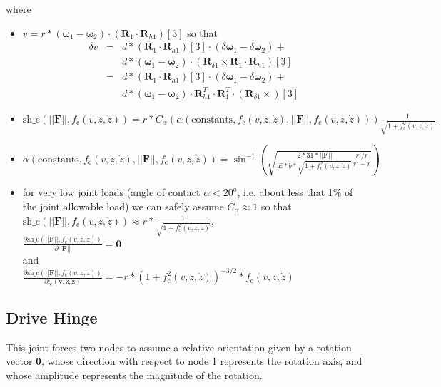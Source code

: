 \documentclass[10pt,dvips,fleqn]{report}
\newcommand{\T}[1]{\boldsymbol{#1}}
\begin{document}
where
\begin{itemize}
\item
$v=r * (\T \omega_{1}-\T \omega_{2})\cdot(\T R_1\cdot \T R_{h1})[3]$
so that
\begin{eqnarray*}
\delta v &=& d * (\T R_1\cdot \T R_{h1})[3] \cdot (\delta \T \omega_{1}- \delta \T \omega_{2}) +\\
	&& d * (\T \omega_{1}-\T \omega_{2})\cdot (\T R_{\delta 1} \times \T R_1 \cdot \T R_{h1})[3]\\
	&=& d * (\T R_1\cdot \T R_{h1})[3] \cdot (\delta \T \omega_{1}- \delta \T \omega_{2}) +\\
	&& d * (\T \omega_{1}-\T \omega_{2})\cdot \T R_{h1}^T \cdot \T R_1^T \cdot (\T R_{\delta 1} \times )[3]
\end{eqnarray*}
\item
$
\mathrm{sh\_c}(||\T F||, f_{\mathrm{c}}(v,z,\dot{z}))=
r * 
C_\alpha(
	\alpha(\mathrm{constants},
		f_{\mathrm{c}}(v,z,\dot{z}),
		||\T F||,
		f_{\mathrm{c}}(v,z,\dot{z})
	)
) 
\frac{\displaystyle 1}{\displaystyle \sqrt{1+f_{\mathrm{c}}^2(v,z,\dot{z})}}
$
\item
$
\alpha(\mathrm{constants},
	f_{\mathrm{c}}(v,z,\dot{z}),
	||\T F||,
	f_{\mathrm{c}}(v,z,\dot{z})
) =
\sin^{-1}\left(
	\sqrt{
		\frac{\displaystyle 2*31*||\T F||}
			{\displaystyle E*b*\sqrt{1+f_{\mathrm{c}}^2(v,z,\dot{z})}}
		\frac{\displaystyle r'/r}
			{\displaystyle r'-r}
	}
\right)
$
\item for very low joint loads (angle of contact $\alpha< 20^{\mathrm{o}}$,
i.e. about less that 1\% of the joint allowable load)
we can safely assume $C_\alpha\approx 1$
so that\\ 
$
\mathrm{sh\_c}(||\T F||, f_{\mathrm{c}}(v,z,\dot{z}))\approx
r * 
\frac{\displaystyle 1}{\displaystyle \sqrt{1+f_{\mathrm{c}}^2(v,z,\dot{z})}}
$,\\

$
\frac{\displaystyle\partial \mathrm{sh\_c}(||\T F||, f_{\mathrm{c}}(v,z,\dot{z}))}
	{\displaystyle \partial ||\T F||} = \T 0
$\\
and\\
$
\frac{\displaystyle\partial \mathrm{sh\_c}(||\T F||, f_{\mathrm{c}}(v,z,\dot{z}))}
	{\displaystyle\partial \mathrm{f_{\mathrm{c}}(v,z,\dot{z})}} =
	-r * (1+f_{\mathrm{c}}^2(v,z,\dot{z}))^{-3/2}*f_{\mathrm{c}}(v,z,\dot{z})
$
\end{itemize}




\subsection{Drive Hinge}
This joint forces two nodes to assume a relative orientation
given by a rotation vector $\T{\theta}$, whose direction with respect
to node 1 represents the rotation axis, and whose amplitude represents 
the magnitude of the rotation.
\end{document}
